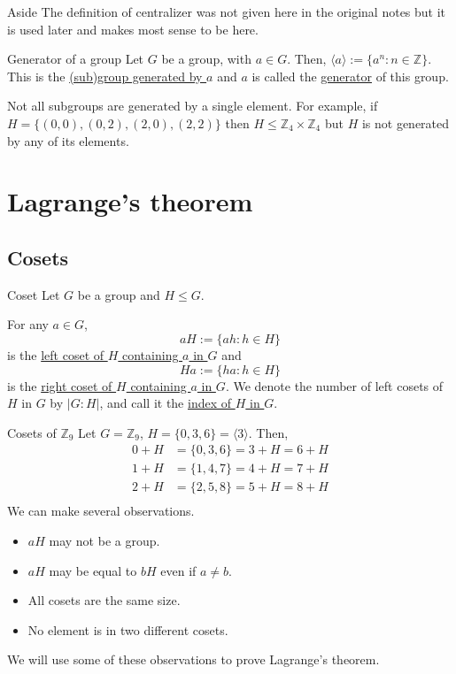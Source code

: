\documentclass[12pt]{article}
\newcommand{\Z}{\mathbb{Z}}
\begin{document}
	\begin{myrem}{Aside}{}
		The definition of centralizer was not given here in the original notes but it is used later and makes most sense to be here.
	\end{myrem}
	
	\begin{mydef}{Generator of a group}{}
		Let $G$ be a group, with $a\in G$. Then, $\langle a\rangle:=\{a^n:n\in\Z\}$. This is the \underline{(sub)group generated by $a$} and $a$ is called the \underline{generator} of this group.
	\end{mydef}
	
	\begin{myrem}{}{}
		Not all subgroups are generated by a single element. For example, if $H=\{(0, 0), (0, 2), (2, 0), (2, 2)\}$ then $H\leq\Z_4\times\Z_4$ but $H$ is not generated by any of its elements.
	\end{myrem}
	
	\section{Lagrange's theorem}	
	\subsection{Cosets}
	\begin{mydef}{Coset}{}
		Let $G$ be a group and $H\leq G$.
		
		For any $a\in G$, $$aH:=\{ah:h\in H\}$$ is the \underline{left coset of $H$ containing $a$ in $G$} and $$Ha:=\{ha:h\in H\}$$ is the \underline{right coset of $H$ containing $a$ in $G$}. We denote the number of left cosets of $H$ in $G$ by $|G:H|$, and call it the \underline{index of $H$ in $G$}.
	\end{mydef}
	
	\begin{myex}{Cosets of $\Z_9$}{}
		Let $G=\Z_9$, $H=\{0, 3, 6\}=\langle 3\rangle$. Then,
		\begin{align*}
			0+H&=\{0, 3, 6\}=3+H=6+H\\
			1+H&=\{1, 4, 7\}=4+H=7+H\\
			2+H&=\{2, 5, 8\}=5+H=8+H\\
		\end{align*}
		We can make several observations.
		\begin{itemize}
			\item $aH$ may not be a group.
			\item $aH$ may be equal to $bH$ even if $a\neq b$.
			\item All cosets are the same size.
			\item No element is in two different cosets.
		\end{itemize}
		We will use some of these observations to prove Lagrange's theorem.
	\end{myex}
	
\end{document}
